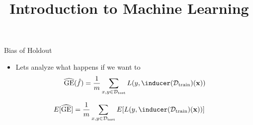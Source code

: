 





\newcommand{\titlefigure}{figure_man/crossvalidation}
\newcommand{\learninggoals}{
\item Understand why resampling is 
    produces a better estimator than hold-out
\item In-depth bias-var analysis of resampling
\item Understand that CV does not produce independent samples
\item Short guideline for practical use 
}


\title{Introduction to Machine Learning}
\date{}



\sloppy



\begin{frame}{Bias of Holdout}


\begin{itemize}
\item Lets analyze what happens if we want to 
$$\GEh(\fh) = \frac{1}{m} \sum_{x,y \in \Dtest} L(y, \inducer(\Dtrain)(\xv)) $$
\end{itemize}

$$ E[\GEh] = \frac{1}{m} \sum_{x,y \in \Dtest} E[ L(y, \inducer(\Dtrain)(\xv)) ] $$



\end{frame}



